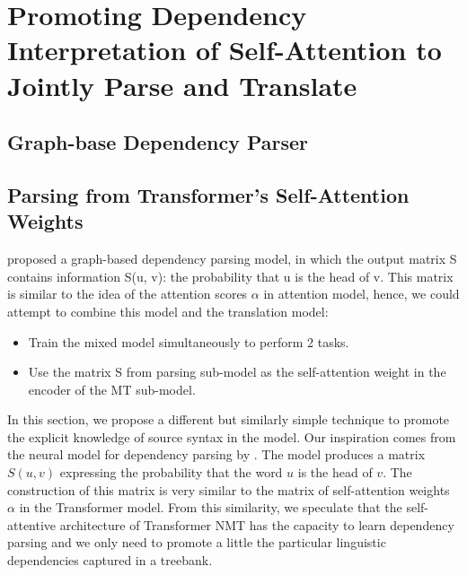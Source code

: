 

\chapter{Promoting Dependency Interpretation of Self-Attention to Jointly Parse and Translate}

\section{Graph-base Dependency Parser}

\section{Parsing from Transformer's Self-Attention Weights}

\cite{DBLP:journals/corr/DozatM16} proposed a graph-based dependency parsing model, in which the output matrix S contains information S(u, v): the probability that u is the head of v.
This matrix is similar to the idea of the attention scores $\alpha$ in attention model, hence, we could attempt to combine this model and the translation model:
\begin{itemize}
    \item Train the mixed model simultaneously to perform 2 tasks.
    \item Use the matrix S from parsing sub-model as the self-attention weight in the encoder of the MT sub-model.
\end{itemize}


In this section, we propose a different but similarly simple technique to
promote the explicit knowledge of source syntax in the model. Our inspiration
comes from
the neural model for dependency parsing by
. The model produces a matrix $S(u, v)$
expressing the probability that the word $u$ is the head of $v$. The
construction of this matrix is very similar to the matrix of self-attention weights $\alpha$ in the Transformer
model. From this similarity, we speculate that the self-attentive architecture
of Transformer NMT
has the capacity to learn dependency parsing and we only need to promote a
little the particular linguistic dependencies captured in a treebank.


